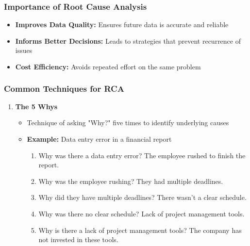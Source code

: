 \documentclass{beamer}
\begin{document}
\begin{frame}[fragile]
    \frametitle{Importance of Root Cause Analysis}
    \begin{itemize}
        \item \textbf{Improves Data Quality:} Ensures future data is accurate and reliable
        \item \textbf{Informs Better Decisions:} Leads to strategies that prevent recurrence of issues
        \item \textbf{Cost Efficiency:} Avoids repeated effort on the same problem
    \end{itemize}
\end{frame}

\begin{frame}[fragile]
    \frametitle{Common Techniques for RCA}
    \begin{enumerate}
        \item \textbf{The 5 Whys}
        \begin{itemize}
            \item Technique of asking "Why?" five times to identify underlying causes
            \item \textbf{Example:} Data entry error in a financial report
                \begin{enumerate}
                    \item Why was there a data entry error? The employee rushed to finish the report.
                    \item Why was the employee rushing? They had multiple deadlines.
                    \item Why did they have multiple deadlines? There wasn't a clear schedule.
                    \item Why was there no clear schedule? Lack of project management tools.
                    \item Why is there a lack of project management tools? The company has not invested in these tools.
                \end{enumerate}
        \end{itemize}
    \end{enumerate}
\end{frame}
\end{document}
